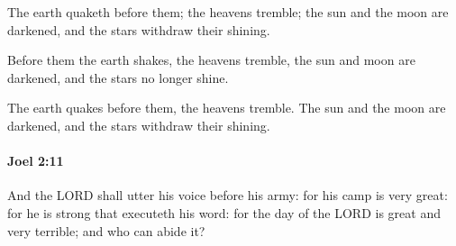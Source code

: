			\begin{versebox}
					\item[BHS] 
					\item[LXX] 
					\item[ASV] The earth quaketh before them; the heavens tremble; the sun and the moon are darkened, and the stars withdraw their shining.
					\item[NIV] Before them the earth shakes, the heavens tremble, the sun and moon are darkened, and the stars no longer shine.
					\item[NRSV] The earth quakes before them, the heavens tremble. The sun and the moon are darkened, and the stars withdraw their shining.
			\end{versebox}

		\paragraph{Joel 2:11} %
			\label{JOEL-2-11}

			And the LORD shall utter his voice before his army: for his camp is very great: for he is strong that executeth his word: for the day of the LORD is great and very terrible; and who can abide it?


